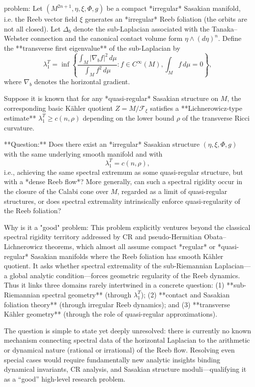 problem:  
Let \((M^{2n+1}, \eta, \xi, \Phi, g)\) be a compact *irregular* Sasakian manifold, i.e. the Reeb vector field \(\xi\) generates an *irregular* Reeb foliation (the orbits are not all closed). Let \(\Delta_b\) denote the sub-Laplacian associated with the Tanaka–Webster connection and the canonical contact volume form \(\eta \wedge (d\eta)^n\). Define the **transverse first eigenvalue** of the sub-Laplacian by  
\[
\lambda_1^T = \inf\left\{ \frac{\int_M |\nabla_b f|^2 \, d\mu}{\int_M f^2\, d\mu} : f \in C^\infty(M), \int_M f\, d\mu = 0 \right\},
\]
where \(\nabla_b\) denotes the horizontal gradient.

Suppose it is known that for any *quasi-regular* Sasakian structure on \(M\), the corresponding basic Kähler quotient \(Z=M/\mathcal{F}_\xi\) satisfies a **Lichnerowicz-type estimate** \(\lambda_1^T \geq c(n,\rho)\) depending on the lower bound \(\rho\) of the transverse Ricci curvature.  

**Question:**  
Does there exist an *irregular* Sasakian structure \((\eta,\xi,\Phi,g)\) with the same underlying smooth manifold and with
\[
\lambda_1^T = c(n,\rho),
\]
i.e., achieving the same spectral extremum as some quasi-regular structure, but with a *dense Reeb flow*?  
More generally, can such a spectral rigidity occur in the closure of the Calabi cone over \(M\), regarded as a limit of quasi-regular structures, or does spectral extremality intrinsically enforce quasi-regularity of the Reeb foliation?

Why is it a "good" problem:  
This problem explicitly ventures beyond the classical spectral rigidity territory addressed by CR and pseudo-Hermitian Obata–Lichnerowicz theorems, which almost all assume compact *regular* or *quasi-regular* Sasakian manifolds where the Reeb foliation has smooth Kähler quotient. It asks whether spectral extremality of the sub-Riemannian Laplacian—a global analytic condition—forces geometric regularity of the Reeb dynamics. Thus it links three domains rarely intertwined in a concrete question:  
(1) **sub-Riemannian spectral geometry** (through \(\lambda_1^T\));  
(2) **contact and Sasakian foliation theory** (through irregular Reeb dynamics); and  
(3) **transverse Kähler geometry** (through the role of quasi-regular approximations).

The question is simple to state yet deeply unresolved: there is currently no known mechanism connecting spectral data of the horizontal Laplacian to the arithmetic or dynamical nature (rational or irrational) of the Reeb flow. Resolving even special cases would require fundamentally new analytic insights binding dynamical invariants, CR analysis, and Sasakian structure moduli—qualifying it as a “good” high-level research problem.